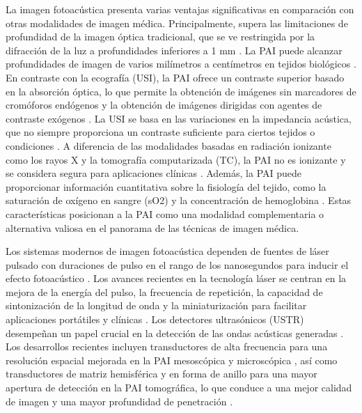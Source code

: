 La imagen fotoacústica presenta varias ventajas significativas en comparación con otras modalidades de imagen médica. Principalmente, supera las limitaciones de profundidad de la imagen óptica tradicional, que se ve restringida por la difracción de la luz a profundidades inferiores a 1 mm \cite{hauptmann_2024}. La PAI puede alcanzar profundidades de imagen de varios milímetros a centímetros en tejidos biológicos \cite{park_2024}. En contraste con la ecografía (USI), la PAI ofrece un contraste superior basado en la absorción óptica, lo que permite la obtención de imágenes sin marcadores de cromóforos endógenos y la obtención de imágenes dirigidas con agentes de contraste exógenos \cite{recent_advances_2025a}. La USI se basa en las variaciones en la impedancia acústica, que no siempre proporciona un contraste suficiente para ciertos tejidos o condiciones \cite{recent_advances_2025a}. A diferencia de las modalidades basadas en radiación ionizante como los rayos X y la tomografía computarizada (TC), la PAI no es ionizante y se considera segura para aplicaciones clínicas \cite{recent_advances_2025a}. Además, la PAI puede proporcionar información cuantitativa sobre la fisiología del tejido, como la saturación de oxígeno en sangre (sO2) y la concentración de hemoglobina \cite{hauptmann_2024}. Estas características posicionan a la PAI como una modalidad complementaria o alternativa valiosa en el panorama de las técnicas de imagen médica.

Los sistemas modernos de imagen fotoacústica dependen de fuentes de láser pulsado con duraciones de pulso en el rango de los nanosegundos para inducir el efecto fotoacústico \cite{recent_advances_2025a}. Los avances recientes en la tecnología láser se centran en la mejora de la energía del pulso, la frecuencia de repetición, la capacidad de sintonización de la longitud de onda y la miniaturización para facilitar aplicaciones portátiles y clínicas \cite{recent_advances_2025a}. Los detectores ultrasónicos (USTR) desempeñan un papel crucial en la detección de las ondas acústicas generadas \cite{recent_advances_2025a}. Los desarrollos recientes incluyen transductores de alta frecuencia para una resolución espacial mejorada en la PAI mesoscópica y microscópica \cite{resolution_enhancement_2024}, así como transductores de matriz hemisférica y en forma de anillo para una mayor apertura de detección en la PAI tomográfica, lo que conduce a una mejor calidad de imagen y una mayor profundidad de penetración \cite{park_2024}.

